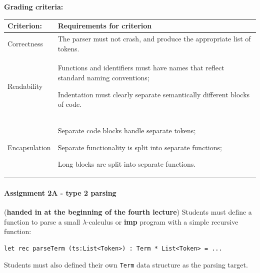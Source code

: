 \documentclass[a4paper, 10pt]{article}
\begin{document}
			\textbf{Grading criteria:} \\
				\begin{tabularx}{\textwidth}{|>{\columncolor{lichtGrijs}} X | p{}|}
					\hline
					\textbf{Criterion:} & \textbf{Requirements for criterion} \\
					\hline
					Correctness & The parser must not crash, and produce the appropriate list of tokens. \\
					\hline
					Readability & 
						\begin{inparaenum}
							\item Functions and identifiers must have names that reflect standard naming conventions;
							\item Indentation must clearly separate semantically different blocks of code.
						\end{inparaenum} \\
					\hline
					Encapsulation & 
						\begin{inparaenum}
							\item Separate code blocks handle separate tokens;
							\item Separate functionality is split into separate functions;
							\item Long blocks are split into separate functions.
						\end{inparaenum} \\
					\hline
				\end{tabularx}			

		\paragraph*{Assignment 2A - type 2 parsing} (\textbf{handed in at the beginning of the fourth lecture})
			Students must define a function to parse a small $\lambda$-calculus or \textbf{imp} program with a simple recursive function:

			\begin{lstlisting}
let rec parseTerm (ts:List<Token>) : Term * List<Token> = ...
			\end{lstlisting}
			
			Students must also defined their own \texttt{Term} data structure as the parsing target.
\end{document}
